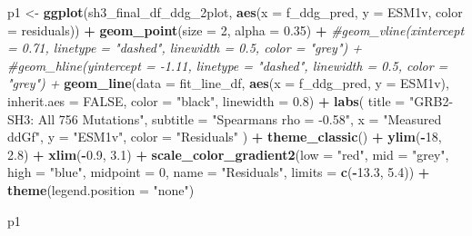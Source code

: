 \documentclass[
]{article}
\newenvironment{Shaded}{\begin{snugshade}}{\end{snugshade}}
\newcommand{\AttributeTok}[1]{\textcolor[rgb]{0.13,0.29,0.53}{#1}}
\newcommand{\CommentTok}[1]{\textcolor[rgb]{0.56,0.35,0.01}{\textit{#1}}}
\newcommand{\ConstantTok}[1]{\textcolor[rgb]{0.56,0.35,0.01}{#1}}
\newcommand{\DecValTok}[1]{\textcolor[rgb]{0.00,0.00,0.81}{#1}}
\newcommand{\FloatTok}[1]{\textcolor[rgb]{0.00,0.00,0.81}{#1}}
\newcommand{\FunctionTok}[1]{\textcolor[rgb]{0.13,0.29,0.53}{\textbf{#1}}}
\newcommand{\NormalTok}[1]{#1}
\newcommand{\OtherTok}[1]{\textcolor[rgb]{0.56,0.35,0.01}{#1}}
\newcommand{\SpecialCharTok}[1]{\textcolor[rgb]{0.81,0.36,0.00}{\textbf{#1}}}
\newcommand{\StringTok}[1]{\textcolor[rgb]{0.31,0.60,0.02}{#1}}
\begin{document}
\begin{Shaded}
\begin{Highlighting}[]
\NormalTok{p1 }\OtherTok{\textless{}{-}} \FunctionTok{ggplot}\NormalTok{(sh3\_final\_df\_ddg\_2plot, }\FunctionTok{aes}\NormalTok{(}\AttributeTok{x =}\NormalTok{ f\_ddg\_pred, }\AttributeTok{y =}\NormalTok{ ESM1v, }\AttributeTok{color =}\NormalTok{ residuals)) }\SpecialCharTok{+}
  \FunctionTok{geom\_point}\NormalTok{(}\AttributeTok{size =} \DecValTok{2}\NormalTok{, }\AttributeTok{alpha =} \FloatTok{0.35}\NormalTok{) }\SpecialCharTok{+}
  \CommentTok{\#geom\_vline(xintercept = 0.71, linetype = "dashed", linewidth = 0.5, color = "grey") +}
  \CommentTok{\#geom\_hline(yintercept = {-}1.11, linetype = "dashed", linewidth = 0.5, color = "grey") +}
  \FunctionTok{geom\_line}\NormalTok{(}\AttributeTok{data =}\NormalTok{ fit\_line\_df, }\FunctionTok{aes}\NormalTok{(}\AttributeTok{x =}\NormalTok{ f\_ddg\_pred, }\AttributeTok{y =}\NormalTok{ ESM1v),}
            \AttributeTok{inherit.aes =} \ConstantTok{FALSE}\NormalTok{, }\AttributeTok{color =} \StringTok{"black"}\NormalTok{, }\AttributeTok{linewidth =} \FloatTok{0.8}\NormalTok{) }\SpecialCharTok{+}
  \FunctionTok{labs}\NormalTok{(}
    \AttributeTok{title =} \StringTok{"GRB2{-}SH3: All 756 Mutations"}\NormalTok{,}
    \AttributeTok{subtitle =} \StringTok{"Spearman\textquotesingle{}s rho = {-}0.58"}\NormalTok{,}
    \AttributeTok{x =} \StringTok{"Measured ddGf"}\NormalTok{,}
    \AttributeTok{y =} \StringTok{"ESM1v"}\NormalTok{,}
    \AttributeTok{color =} \StringTok{"Residuals"}
\NormalTok{  ) }\SpecialCharTok{+}
  \FunctionTok{theme\_classic}\NormalTok{() }\SpecialCharTok{+}
  \FunctionTok{ylim}\NormalTok{(}\SpecialCharTok{{-}}\DecValTok{18}\NormalTok{, }\FloatTok{2.8}\NormalTok{) }\SpecialCharTok{+} \FunctionTok{xlim}\NormalTok{(}\SpecialCharTok{{-}}\FloatTok{0.9}\NormalTok{, }\FloatTok{3.1}\NormalTok{) }\SpecialCharTok{+}
  \FunctionTok{scale\_color\_gradient2}\NormalTok{(}\AttributeTok{low =} \StringTok{"red"}\NormalTok{, }\AttributeTok{mid =} \StringTok{"grey"}\NormalTok{, }\AttributeTok{high =} \StringTok{"blue"}\NormalTok{, }\AttributeTok{midpoint =} \DecValTok{0}\NormalTok{, }\AttributeTok{name =} \StringTok{"Residuals"}\NormalTok{,}
                        \AttributeTok{limits =} \FunctionTok{c}\NormalTok{(}\SpecialCharTok{{-}}\FloatTok{13.3}\NormalTok{, }\FloatTok{5.4}\NormalTok{)) }\SpecialCharTok{+}
  \FunctionTok{theme}\NormalTok{(}\AttributeTok{legend.position =} \StringTok{"none"}\NormalTok{)}

\NormalTok{p1}
\end{Highlighting}
\end{Shaded}
\end{document}
